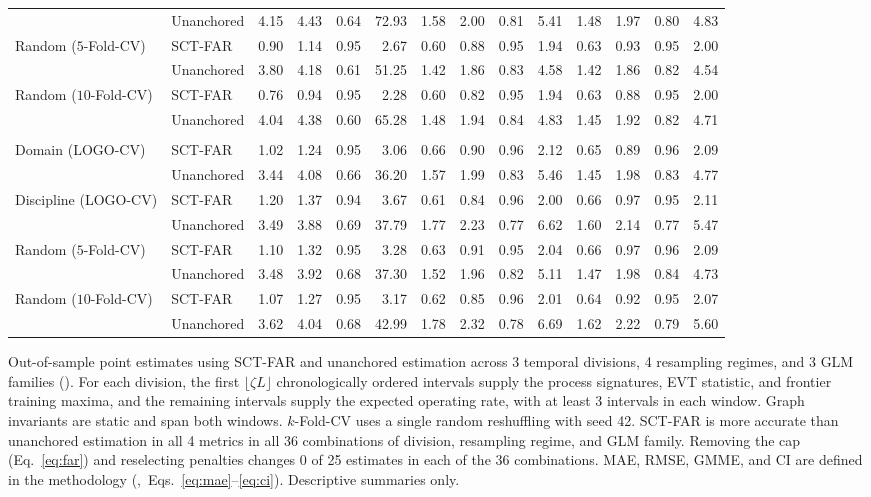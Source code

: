 \documentclass{article}
\begin{document}
\begin{table}[H]
\begin{tabularx}{\linewidth}{@{}>{\raggedright\arraybackslash}Xlrrrrrrrrrrrr@{}}
 & Unanchored & 4.15 & 4.43 & 0.64 & 72.93 & 1.58 & 2.00 & 0.81 & 5.41 & 1.48 & 1.97 & 0.80 & 4.83 \\
Random ($5$-Fold-CV) & SCT-FAR & 0.90 & 1.14 & 0.95 & 2.67 & 0.60 & 0.88 & 0.95 & 1.94 & 0.63 & 0.93 & 0.95 & 2.00 \\
 & Unanchored & 3.80 & 4.18 & 0.61 & 51.25 & 1.42 & 1.86 & 0.83 & 4.58 & 1.42 & 1.86 & 0.82 & 4.54 \\
Random ($10$-Fold-CV) & SCT-FAR & 0.76 & 0.94 & 0.95 & 2.28 & 0.60 & 0.82 & 0.95 & 1.94 & 0.63 & 0.88 & 0.95 & 2.00 \\
 & Unanchored & 4.04 & 4.38 & 0.60 & 65.28 & 1.48 & 1.94 & 0.84 & 4.83 & 1.45 & 1.92 & 0.82 & 4.71 \\
\addlinespace
\multicolumn{14}{@{}l}{\textbf{Prior Window 75\%}} \\
Domain (LOGO-CV) & SCT-FAR & 1.02 & 1.24 & 0.95 & 3.06 & 0.66 & 0.90 & 0.96 & 2.12 & 0.65 & 0.89 & 0.96 & 2.09 \\
 & Unanchored & 3.44 & 4.08 & 0.66 & 36.20 & 1.57 & 1.99 & 0.83 & 5.46 & 1.45 & 1.98 & 0.83 & 4.77 \\
Discipline (LOGO-CV) & SCT-FAR & 1.20 & 1.37 & 0.94 & 3.67 & 0.61 & 0.84 & 0.96 & 2.00 & 0.66 & 0.97 & 0.95 & 2.11 \\
 & Unanchored & 3.49 & 3.88 & 0.69 & 37.79 & 1.77 & 2.23 & 0.77 & 6.62 & 1.60 & 2.14 & 0.77 & 5.47 \\
Random ($5$-Fold-CV) & SCT-FAR & 1.10 & 1.32 & 0.95 & 3.28 & 0.63 & 0.91 & 0.95 & 2.04 & 0.66 & 0.97 & 0.96 & 2.09 \\
 & Unanchored & 3.48 & 3.92 & 0.68 & 37.30 & 1.52 & 1.96 & 0.82 & 5.11 & 1.47 & 1.98 & 0.84 & 4.73 \\
Random ($10$-Fold-CV) & SCT-FAR & 1.07 & 1.27 & 0.95 & 3.17 & 0.62 & 0.85 & 0.96 & 2.01 & 0.64 & 0.92 & 0.95 & 2.07 \\
 & Unanchored & 3.62 & 4.04 & 0.68 & 42.99 & 1.78 & 2.32 & 0.78 & 6.69 & 1.62 & 2.22 & 0.79 & 5.60 \\
\bottomrule
\end{tabularx}
\par\vspace{12pt}
\begin{minipage}{\linewidth}
\footnotesize
Out-of-sample point estimates using SCT-FAR and unanchored estimation across 3 temporal divisions, 4 resampling regimes, and 3 GLM families (). For each division, the first $\lfloor \zeta L \rfloor$ chronologically ordered intervals supply the process signatures, EVT statistic, and frontier training maxima, and the remaining intervals supply the expected operating rate, with at least 3 intervals in each window. Graph invariants are static and span both windows. $k$-Fold-CV uses a single random reshuffling with seed 42. SCT-FAR is more accurate than unanchored estimation in all 4 metrics in all 36 combinations of division, resampling regime, and GLM family. Removing the cap (Eq.~\eqref{eq:far}) and reselecting penalties changes 0 of 25 estimates in each of the 36 combinations. MAE, RMSE, GMME, and CI are defined in the methodology (,~Eqs.~\eqref{eq:mae}--\eqref{eq:ci}). Descriptive summaries only.

\end{minipage}
\end{table}
\end{document}
